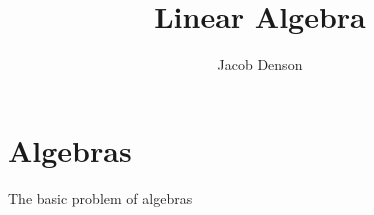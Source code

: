 

\title{Linear Algebra}
\author{Jacob Denson}



\maketitle
\tableofcontents
{}

\chapter{Algebras}

The basic problem of algebras

